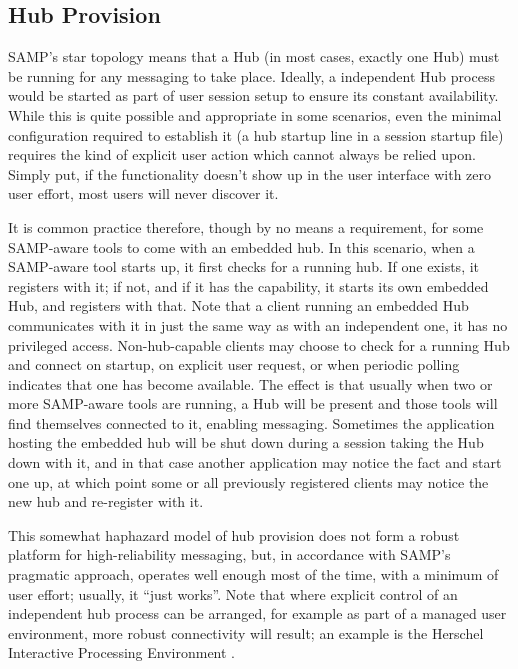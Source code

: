 \documentclass[5p]{elsarticle}
\begin{document}
\subsection{Hub Provision} \label{sec:hubProvision}

SAMP's star topology means that a Hub (in most cases, exactly one Hub)
must be running for any messaging to take place.
Ideally, a independent Hub process would be started
as part of user session setup to ensure its constant availability.
While this is quite possible and appropriate in some scenarios,
even the minimal configuration required to establish it
(a hub startup line in a session startup file)
requires the kind of explicit user action which cannot always be relied upon.
Simply put, if the functionality doesn't show up in the user interface
with zero user effort, most users will never discover it.

It is common practice therefore, though by no means a requirement,
for some SAMP-aware tools to come with an embedded hub.
In this scenario, when a SAMP-aware tool starts up, it first checks for
a running hub.
If one exists, it registers with it;
if not, and if it has the capability, it starts its own embedded Hub,
and registers with that.
Note that a client running an embedded Hub communicates with it in
just the same way as with an independent one, it has no privileged access.
Non-hub-capable clients may choose to check for a running Hub and connect
on startup, on explicit user request, or when periodic polling indicates
that one has become available.
The effect is that usually when two or more SAMP-aware tools are running,
a Hub will be present and those tools will find themselves connected to it,
enabling messaging.
Sometimes the application hosting the embedded hub will be shut down
during a session taking the Hub down with it,
and in that case another application may notice the fact and start one up,
at which point some or all previously registered clients may notice
the new hub and re-register with it.

This somewhat haphazard model of hub provision does not form a
robust platform for high-reliability messaging,
but, in accordance with SAMP's pragmatic approach,
operates well enough most of the time, with a minimum of user effort;
usually, it ``just works''.
Note that where explicit control of an independent hub process
can be arranged,
for example as part of a managed user environment,
more robust connectivity will result;
an example is the Herschel Interactive Processing Environment
\citep{2012ASPC..461..733B}.
\end{document}
